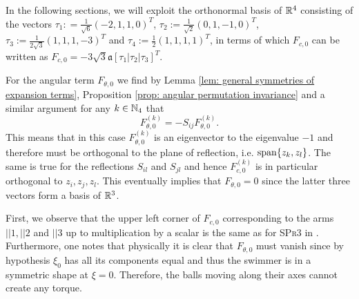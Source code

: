 In the following sections, we will exploit the orthonormal basis of $\mathbb{R}^4$ consisting of the vectors $\tau_1 : = \tfrac{1}{\sqrt{6}}(-2,1,1,0)^T$, $\tau_2 := \tfrac{1}{\sqrt{2}}(0,1,-1,0)^T$, $\tau_{3}:= \tfrac{1}{2 \sqrt{3}} (1,1,1,-3)^T$ and $\tau_4:= \tfrac{1}{2}(1,1,1,1)^T$, in terms of which $F_{c,0}$ can be written as $F_{c, 0} = -3 \sqrt{3} \mathfrak{a} [\tau_1|\tau_2| \tau_3 ]^T$.

For the angular term $F_{\theta,0}$ we find by Lemma \ref{lem: general symmetries of expansion terms}, Proposition \ref{prop: angular permutation invariance} and a similar argument for any $k \in \mathbb{N}_4$ that
\begin{equation}
F_{\theta, 0}^{(k)} = -S_{ij} F_{\theta, 0}^{(k)}.
\end{equation}
This means that in this case $F_{\theta,0}^{(k)}$ is an eigenvector to the eigenvalue $-1$ and therefore must be orthogonal to the plane of reflection, i.e. $\operatorname{span}\{z_k, z_l\}$. The same is true for the reflections $S_{il}$ and $S_{jl}$ and hence $F_{c,0}^{(k)}$ is in particular orthogonal to $z_i, z_j, z_l$. This eventually implies that $ F_{\theta, 0} = 0$ since the latter three vectors form a basis of $\mathbb{R}^3$.

\begin{remark}
First, we observe that the upper left corner of $F_{c,0}$ corresponding to the arms $||1, ||2$ and $||3$ up to multiplication by a scalar is the same as for \textsc{SPr3} in \cite{Alouges2017}. Furthermore, one notes that physically it is  clear that $F_{\theta,0}$ must vanish since by hypothesis $\xi_0$ has all its components equal and thus the swimmer is in a symmetric shape at $\xi = 0$. Therefore, the balls moving along their axes cannot create any torque.
\end{remark}



